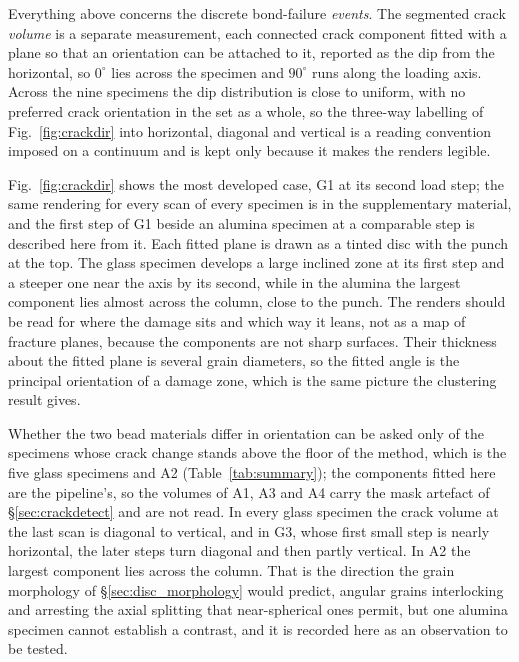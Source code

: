\documentclass[preprint,12pt,numbers]{elsarticle}
\begin{document}
  \label{sec:res_crackdir}
  Everything above concerns the discrete bond-failure \emph{events}.  The
  segmented crack \emph{volume} is a separate measurement, each connected
  crack component fitted with a plane so that an orientation can be attached
  to it, reported as the dip from the horizontal, so $0^\circ$ lies across the
  specimen and $90^\circ$ runs along the loading axis.  Across the nine
  specimens the dip distribution is close to uniform, with no preferred crack
  orientation in the set as a whole, so the three-way labelling of
  Fig.~\ref{fig:crackdir} into horizontal, diagonal and vertical is a reading
  convention imposed on a continuum and is kept only because it makes the
  renders legible.

  Fig.~\ref{fig:crackdir} shows the most developed case, G1 at its second
  load step; the same rendering for every scan of every specimen is in the
  supplementary material, and the first step of G1 beside an alumina
  specimen at a comparable step is described here from it.  Each fitted plane is drawn as a tinted disc with the punch
  at the top.  The glass specimen develops a large inclined zone at its first
  step and a steeper one near the axis by its second, while in the alumina the
  largest component lies almost across the column, close to the punch.  The
  renders should be read for where the damage sits and which way it leans,
  not as a map of fracture planes, because the components are not sharp
  surfaces.  Their thickness about the fitted plane is several grain
  diameters, so the fitted angle is the principal orientation of a damage
  zone, which is the same picture the clustering result gives.

  Whether the two bead materials differ in orientation can be asked only of
  the specimens whose crack change stands above the floor of the method,
  which is the five glass specimens and A2 (Table~\ref{tab:summary}); the
  components fitted here are the pipeline's, so the volumes of A1, A3 and A4
  carry the mask artefact of \S\ref{sec:crackdetect} and are not read.  In
  every glass specimen the crack volume at the last scan is diagonal to
  vertical, and in G3, whose first small step is nearly horizontal, the later
  steps turn diagonal and then partly vertical.  In A2 the
  largest component lies across the column.  That is the direction the grain
  morphology of \S\ref{sec:disc_morphology} would predict, angular grains
  interlocking and arresting the axial splitting that near-spherical ones
  permit, but one alumina specimen cannot establish a contrast, and it is
  recorded here as an observation to be tested.
\end{document}

